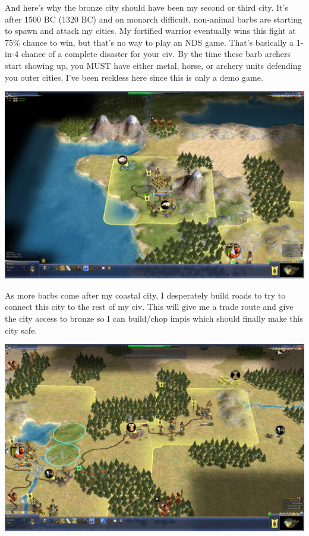 \documentclass[10pt]{article}
\begin{document}
And here's why the bronze city should have been my second or third city. It's after 1500 BC (1320 BC) and
on monarch difficult, non-animal barbs are starting to spawn and attack my cities. My fortified warrior
eventually wins this fight at 75\% chance to win, but that's no way to play an NDS game. That's basically
a 1-in-4 chance of a complete disaster for your civ. By the time these barb archers start showing up, you
MUST have either metal, horse, or archery units defending you outer cities. I've been reckless here since
this is only a demo game.

\includegraphics[width=1.0\textwidth]{36}

As more barbs come after my coastal city, I desperately build roads to try to connect this city to the
rest of my civ. This will give me a trade route and give the city access to bronze so I can build/chop
impis which should finally make this city safe.

\includegraphics[width=1.0\textwidth]{37}
\end{document}
